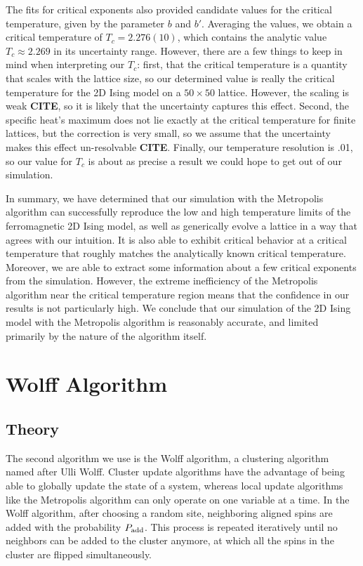 \documentclass[twocolumn,aps,prl]{revtex4-1} %
\begin{document}
The fits for critical exponents also provided candidate values for the critical temperature, given by the parameter $b$ and $b'$. Averaging the values, we obtain a critical temperature of $T_c = 2.276(10)$, which contains the analytic value $T_c \approx 2.269$ in its uncertainty range. However, there are a few things to keep in mind when interpreting our $T_c$: first, that the critical temperature is a quantity that scales with the lattice size, so our determined value is really the critical temperature for the 2D Ising model on a $50 \times 50$ lattice. However, the scaling is weak \textbf{CITE}, so it is likely that the uncertainty captures this effect. Second, the specific heat's maximum does not lie exactly at the critical temperature for finite lattices, but the correction is very small, so we assume that the uncertainty makes this effect un-resolvable \textbf{CITE}. Finally, our temperature resolution is .01, so our value for $T_c$ is about as precise a result we could hope to get out of our simulation.

In summary, we have determined that our simulation with the Metropolis algorithm can successfully reproduce the low and high temperature limits of the ferromagnetic 2D Ising model, as well as generically evolve a lattice in a way that agrees with our intuition. It is also able to exhibit critical behavior at a critical temperature that roughly matches the analytically known critical temperature. Moreover, we are able to extract some information about a few critical exponents from the simulation. However, the extreme inefficiency of the Metropolis algorithm near the critical temperature region means that the confidence in our results is not particularly high. We conclude that our simulation of the 2D Ising model with the Metropolis algorithm is reasonably accurate, and limited primarily by the nature of the algorithm itself.






\section{Wolff Algorithm}
\subsection{Theory}
The second algorithm we use is the Wolff algorithm, a clustering algorithm named after Ulli Wolff. Cluster update algorithms have the advantage of being able to globally update the state of a system, whereas local update algorithms like the Metropolis algorithm can only operate on one variable at a time. In the Wolff algorithm, after choosing a random site, neighboring aligned spins are added with the probability $P_{\rm add}$. This process is repeated iteratively until no neighbors can be added to the cluster anymore, at which all the spins in the cluster are flipped simultaneously. 
\end{document}

